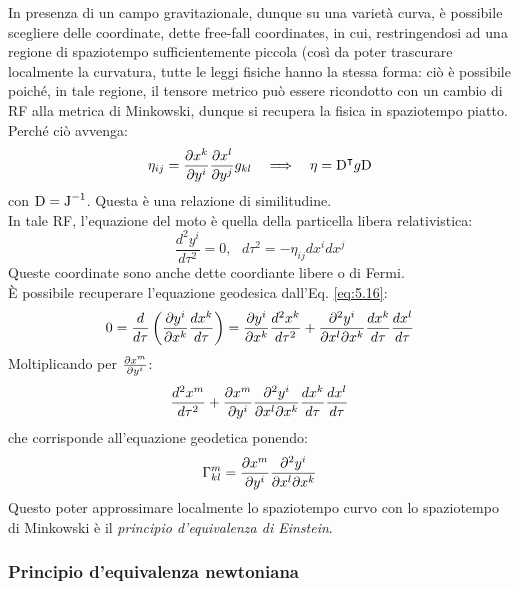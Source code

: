 In presenza di un campo gravitazionale, dunque su una varietà curva, è possibile scegliere delle coordinate, dette free-fall coordinates, in cui, restringendosi ad una regione di spaziotempo sufficientemente piccola (così da poter trascurare localmente la curvatura, tutte le leggi fisiche hanno la stessa forma: ciò è possibile poiché, in tale regione, il tensore metrico può essere ricondotto con un cambio di RF alla metrica di Minkowski, dunque si recupera la fisica in spaziotempo piatto.\\
Perché ciò avvenga:
\begin{equation}
	\eta_{ij} = \frac{\partial x^k}{\partial y^i} \frac{\partial x^l}{\partial y^j} g_{kl} \quad\Longrightarrow\quad \eta = \mathbf{\text{D}}^{\intercal} g \mathbf{\text{D}}
	\label{eq:5.15}
\end{equation}
con $ \mathbf{\text{D}} = \mathbf{\text{J}}^{-1} $. Questa è una relazione di similitudine.\\
In tale RF, l'equazione del moto è quella della particella libera relativistica:
\begin{equation}
	\frac{d^2 y^i}{d \tau^2} = 0, \,\,\,\, d\tau^2 = - \eta_{ij} dx^i dx^j
	\label{eq:5.16}
\end{equation}
Queste coordinate sono anche dette coordiante libere o di Fermi.\\
È possibile recuperare l'equazione geodesica dall'Eq. \ref{eq:5.16}:
\begin{equation}
	0 = \frac{d}{d\tau} \left( \frac{\partial y^i}{\partial x^k} \frac{dx^k}{d\tau} \right) = \frac{\partial y^i}{\partial x^k} \frac{d^2 x^k}{d\tau^2} + \frac{\partial^2 y^i}{\partial x^l \partial x^k} \frac{dx^k}{d\tau} \frac{dx^l}{d\tau}
	\label{eq:5.17}
\end{equation}
Moltiplicando per $ \frac{\partial x^m}{\partial y^i} $:
\begin{equation}
	\frac{d^2 x^m}{d\tau^2} + \frac{\partial x^m}{\partial y^i} \frac{\partial^2 y^i}{\partial x^l \partial x^k} \frac{dx^k}{d\tau} \frac{dx^l}{d\tau}
	\label{eq:5.18}
\end{equation}
che corrisponde all'equazione geodetica ponendo:
\begin{equation}
	\Gamma^m_{kl} = \frac{\partial x^m}{\partial y^i} \frac{\partial^2 y^i}{\partial x^l \partial x^k}
	\label{eq:5.19}
\end{equation}
Questo poter approssimare localmente lo spaziotempo curvo con lo spaziotempo di Minkowski è il \textit{principio d'equivalenza di Einstein}.

\subsubsection{Principio d'equivalenza newtoniana}

